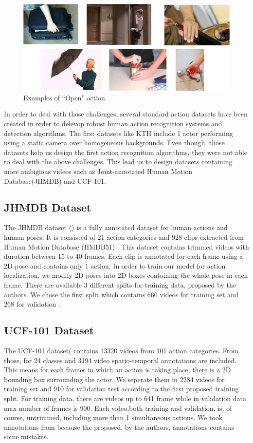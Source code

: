 \documentclass{report}
\begin{document}
\begin{figure}[h]
  \centering
  \includegraphics[scale=0.3]{open_example}
  \caption{Examples of ``Open'' action}
  \label{fig:open_example}

\end{figure}

In order to deal with those challenges, several standard action datasets have been created in order to delevop
robust human action recognition systems and detection algorithms.
The first datasets like KTH\cite{} include 1 actor performing using a static camera over homogeneous backgrounds.
Even though, those datasets help us design the first action recognition algorithms, they were not able to deal with the above
challenges.
This lead us to design datasets containing more ambigious videos such as Joint-annotated Human Motion Database(JHMDB)\cite{}
and UCF-101\cite{}.
\subsection{JHMDB Dataset}
The JHMDB dataset (\cite{Jhuang:ICCV:2013}) is a fully annotated dataset for human actions and human poses. It is consisted of 21 action categories and 928
clips extracted from Human Motion Database (HMDB51) \cite{Kuehne11}. This dataset contains trimmed videos with duration between
15 to 40 frames. Each clip is annotated for each frame using a 2D pose and contains only 1 action.
In order to train our model for action localization, we modify 2D poses into 2D boxes containing the whole pose in each frame.
There are available 3 different splits for training data, proposed by the authors. We chose the first split which contains 660
videos for training set and 268 for validation . 

\subsection{UCF-101 Dataset}
The UCF-101 dataset(\cite{soomro2012ucf101} contains 13320 videos from 101 action categories.
From those, for 24 classes and 3194 video spatio-temporal annotations are included. This means for each frames in which an action is taking place,
there is a 2D bounding box surrounding the actor.  We seperate them in 2284 videos for training set and 910 for validation test according to the
first proposed training split. For training data, there are videos up to 641 frame while in validation data max number of frames is 900.
Each video,both training and validation, is, of course, untrimmed,  including more than 1 simultaneous actions. We took annotations from
\cite{singh2016online} because the proposed, by the authors, annotations contains some mistakes.
\end{document}
